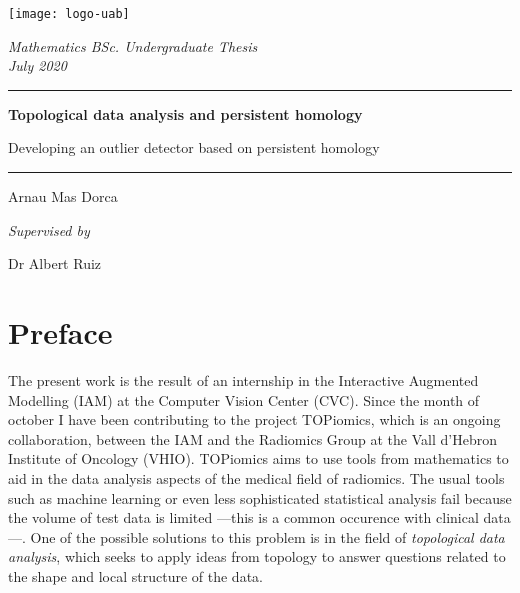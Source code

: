 \documentclass[12pt, oneside]{book}
\title{}
\author{Arnau Mas}
\date{}
\begin{document}
\begin{titlepage}
	\centering \sffamily

	\vspace*{2cm}

	\texttt{[image: logo-uab]}

	\vspace{2cm}

	{\Large \itshape Mathematics BSc. Undergraduate Thesis} \\
	{\large \itshape July 2020}

	\vspace{10pt}
	\hrule
	\vspace{10pt}
	{\bfseries \LARGE Topological data analysis and persistent homology}

	{\Large Developing an outlier detector based on persistent homology}
	\vspace{10pt}
	\hrule		
	\vspace{2cm}

	{\LARGE Arnau Mas Dorca}

	\vspace{1cm}
	{\large \itshape Supervised by}

	{\Large Dr Albert Ruiz}
\end{titlepage}
\thispagestyle{empty}

\pagestyle{plain}
\frontmatter
{\footnotesize \sffamily \tableofcontents}

\pagebreak
{}
\section*{Preface}
The present work is the result of an internship in the Interactive Augmented Modelling
(IAM) at the Computer Vision Center (CVC). Since the month of october I have been
contributing to the project TOPiomics, which is an ongoing collaboration,
between the IAM and the Radiomics Group at the Vall d'Hebron Institute of
Oncology (VHIO). TOPiomics aims to use tools from mathematics to aid in the data analysis
aspects of the medical field of radiomics. The usual tools such as machine learning or
even less sophisticated statistical analysis fail because the volume of test data is
limited ---this is a common occurence with clinical data---. One of the possible solutions
to this problem is in the field of \emph{topological data analysis}, which seeks to
apply ideas from topology to answer questions related to the shape and local structure
of the data. 
\end{document}

